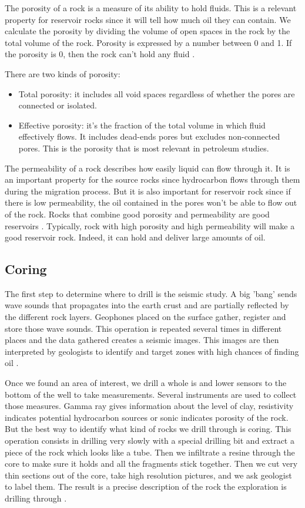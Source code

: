 The porosity of a rock is a measure of its ability to hold fluids. This is a relevant property for reservoir rocks since it will tell how much oil they can contain. We calculate the porosity by dividing the volume of open spaces in the rock by the total volume of the rock. Porosity is expressed by a number between 0 and 1. If the porosity is 0, then the rock can't hold any fluid \cite{oilbegin}. 
 
There are two kinds of porosity:
\begin{itemize}
    \item Total porosity: it includes all void spaces regardless of whether the pores are connected or isolated.
    \item Effective porosity: it's the fraction of the total volume in which fluid effectively flows. It includes dead-ends pores but excludes non-connected pores. This is the porosity that is most relevant in petroleum studies. 
\end{itemize}

The permeability of a rock describes how easily liquid can flow through it. It is an important property for the source rocks since hydrocarbon flows through them during the migration process. But it is also important for reservoir rock since if there is low permeability, the oil contained in the pores won't be able to flow out of the rock. 
Rocks that  combine good porosity and permeability are good reservoirs . Typically, rock with high porosity and high permeability will make a good reservoir rock. Indeed, it can hold and deliver large amounts of oil. 

\subsection{Coring}\label{sec:coring}
The first step to determine where to drill is the seismic study. A big 'bang' sends wave sounds that propagates into the earth crust and are partially reflected by the different rock layers. Geophones placed on the surface gather, register and store those wave sounds. This operation is repeated several times in different places and the data gathered creates a seismic images. This images are then interpreted by geologists to identify and target zones with high chances of finding oil \cite{oilbegin}. 


Once we found an area of interest, we drill a whole is and lower sensors  to the bottom of the well to take measurements. Several instruments are used to collect those measures.  Gamma ray gives information about the level of clay, resistivity indicates potential hydrocarbon sources or sonic indicates porosity of the rock. But the best way to identify what kind of rocks we drill through is coring. This operation consists in drilling very slowly with a special drilling bit and extract a piece of the rock which looks like a tube. Then we infiltrate a resine through the core to make sure it holds and all the fragments stick together. Then we cut very thin sections out of the core, take high resolution pictures, and we ask geologist to label them. The result is a precise description of the rock the exploration is drilling through \cite{oilbegin}.  

